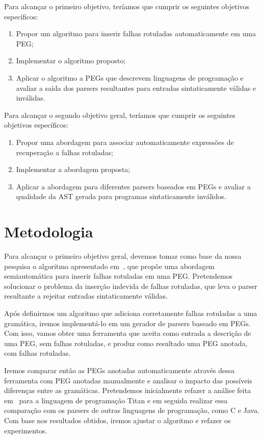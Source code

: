 \documentclass[titlepage,12pt]{article}
\begin{document}
Para alcançar o primeiro objetivo, teríamos que cumprir os seguintes
objetivos específicos:
	\begin{enumerate}
		\item Propor um algoritmo para inserir falhas rotuladas
    automaticamente em uma PEG;
    \item Implementar o algoritmo proposto;
    \item Aplicar o algoritmo a PEGs que descrevem linguagens de
    programação e avaliar a saída dos parsers resultantes para entradas
    sintaticamente válidas e inválidas.
	\end{enumerate}
 

Para alcançar o segundo objetivo geral, teríamos que cumprir os seguintes
objetivos específicos:
	\begin{enumerate}
		\item Propor uma abordagem para associar automaticamente expressões
    de recuperação a falhas rotuladas;
    \item Implementar a abordagem proposta;
    \item Aplicar a abordagem para diferentes parsers baseados em PEGs
    e avaliar a qualidade da AST gerada para programas sintaticamente
    inválidos.
	\end{enumerate}
 

\section{Metodologia}
\label{sec:met}


Para alcançar o primeiro objetivo geral, devemos tomar como
base da nossa pesquisa o algoritmo apresentado em~\cite{medeiros2018sblp},
que propõe uma abordagem semiautomática para inserir falhas
rotuladas em uma PEG. Pretendemos solucionar o problema
da inserção indevida de falhas rotuladas, que leva o
parser resultante a rejeitar entradas sintaticamente válidas.

Após definirmos um algoritmo que adiciona corretamente falhas
rotuladas a uma gramática, iremos implementá-lo em
um gerador de parsers baseado em PEGs. Com isso, vamos
obter uma ferramenta que aceita como entrada a descrição de uma
PEG, sem falhas rotuladas, e produz como resultado uma PEG
anotada, com falhas rotuladas.
 
Iremos comparar então as PEGs anotadas automaticamente através
dessa ferramenta com PEG anotadas manualmente e analisar o impacto das
possíveis diferenças entre as gramáticas. Pretendemos inicialmente refazer a análise
feita em~\cite{medeiros2018sblp} para a linguagem de programação
Titan e em seguida realizar essa comparação com os parsers de outras
linguagens de programação, como C e Java. Com base nos resultados
obtidos, iremos ajustar o algoritmo e refazer os experimentos. 
\end{document}
